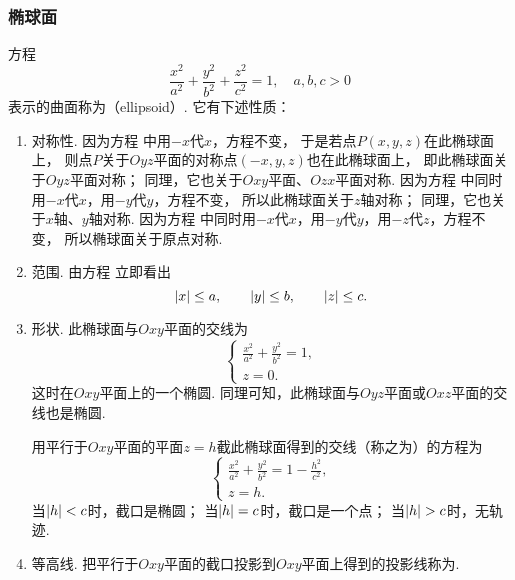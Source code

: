 \subsubsection{椭球面}
方程\begin{equation}\label{equation:解析几何.椭球面的一般方程}
	\frac{x^2}{a^2}+\frac{y^2}{b^2}+\frac{z^2}{c^2}=1,
	\quad a,b,c>0
\end{equation}
表示的曲面称为（ellipsoid）.
它有下述性质：
\begin{enumerate}
	\item 对称性.
	因为方程  中用\(-x\)代\(x\)，方程不变，
	于是若点\(P(x,y,z)\)在此椭球面上，
	则点\(P\)关于\(Oyz\)平面的对称点\((-x,y,z)\)也在此椭球面上，
	即此椭球面关于\(Oyz\)平面对称；
	同理，它也关于\(Oxy\)平面、\(Ozx\)平面对称.
	因为方程  中同时用\(-x\)代\(x\)，用\(-y\)代\(y\)，方程不变，
	所以此椭球面关于\(z\)轴对称；
	同理，它也关于\(x\)轴、\(y\)轴对称.
	因为方程  中同时用\(-x\)代\(x\)，用\(-y\)代\(y\)，用\(-z\)代\(z\)，方程不变，
	所以椭球面关于原点对称.

	\item 范围.
	由方程  立即看出\[
		\abs{x} \leq a, \qquad
		\abs{y} \leq b, \qquad
		\abs{z} \leq c.
	\]

	\item 形状.
	此椭球面与\(Oxy\)平面的交线为\[
		\left\{ \begin{array}{l}
			\frac{x^2}{a^2}+\frac{y^2}{b^2}=1, \\
			z = 0.
		\end{array} \right.
	\]
	这时在\(Oxy\)平面上的一个椭圆.
	同理可知，此椭球面与\(Oyz\)平面或\(Oxz\)平面的交线也是椭圆.

	用平行于\(Oxy\)平面的平面\(z = h\)截此椭球面得到的交线（称之为）的方程为\[
		\left\{ \begin{array}{l}
			\frac{x^2}{a^2}+\frac{y^2}{b^2}=1-\frac{h^2}{c^2}, \\
			z = h.
		\end{array} \right.
	\]
	当\(\abs{h} < c\)时，截口是椭圆；
	当\(\abs{h} = c\)时，截口是一个点；
	当\(\abs{h} > c\)时，无轨迹.

	\item 等高线.
	把平行于\(Oxy\)平面的截口投影到\(Oxy\)平面上得到的投影线称为.
\end{enumerate}

